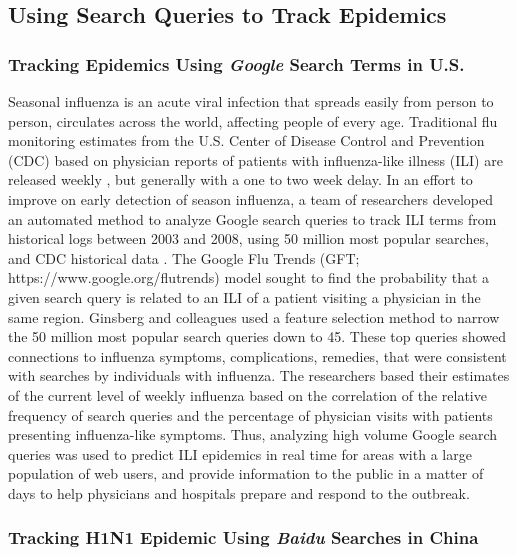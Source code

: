 \documentclass[sigconf]{acmart}
\begin{document}
\subsection{Using Search Queries to Track Epidemics}

\subsubsection{Tracking Epidemics Using {\itshape Google} Search Terms in U.S.}

Seasonal influenza is an acute viral infection that spreads easily from person to 
person, circulates across the world, affecting people of every age. Traditional 
flu monitoring estimates from the U.S. Center of Disease Control and Prevention 
(CDC) based on physician reports of patients with influenza-like illness (ILI) are 
released weekly \cite{cdc17}, but generally with a one to two week delay. In an effort 
to improve on early detection of season influenza, a team of researchers developed an 
automated method to analyze Google search queries to track ILI terms from historical 
logs between 2003 and 2008, using 50 million most popular searches, and CDC historical 
data \cite{ginsburg09}. The Google Flu Trends (GFT; https://www.google.org/flutrends)
model sought to find the probability that a given search query is related to an ILI 
of a patient visiting a physician in the same region. Ginsberg and colleagues used 
a feature selection method to narrow  the 50 million most popular search queries down
to 45. These top queries showed connections to influenza symptoms, complications, 
remedies, that were consistent with searches by individuals with influenza. The 
researchers based their estimates of the current level of weekly influenza based on 
the correlation of the relative frequency of search queries and the percentage of 
physician visits with patients presenting influenza-like symptoms. Thus, analyzing 
high volume Google search queries was used to predict ILI epidemics in real time for 
areas with a large population of web users, and provide information to the public in 
a matter of days to help physicians and hospitals prepare and respond to the 
outbreak. 

\subsubsection{Tracking H1N1 Epidemic Using {\itshape Baidu} Searches in China}
\end{document}
